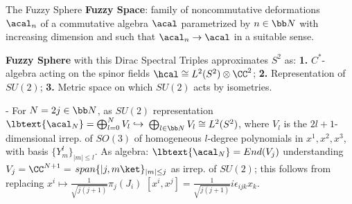 \begin{frame}{The Fuzzy Sphere} %
    \textbf{Fuzzy Space}: %
    family of noncommutative deformations $\acal_n$ of a commutative algebra $\acal$ parametrized by $n \in \bb N$ with increasing dimension and such that $\acal_n \to \acal$ in a suitable sense.
    
    \textbf{Fuzzy Sphere} with this Dirac Spectral Triples  \cite{DAndrea2013} approximates $S^2$ as: \textbf{1.} $C^*$-algebra acting on the spinor fields $\hcal \cong L^2(S^2)\otimes \CC^2$; \textbf{2.} Representation of $SU(2)$; \textbf{3.}  Metric space on which $SU(2)$ acts by isometries.
    
    - For $N = 2j \in \bb N$, as $SU(2)$ representation $\lbtext{\acal_N}= \bigoplus_{l = 0}^N V_l \hookrightarrow$ $ \bigoplus_{l \in \bb N} V_l \cong L^2(S^2)$, where $V_l$ is the $2l+1$-dimensional irrep. of $SO(3)$ of homogeneous $l$-degree polynomials in $x^1, x^2, x^3$, with basis $\{Y^l_m\}_{|m| \leq l}$. As algebra: $\lbtext{\acal_N} = End(V_j)$ understanding $V_j= \CC^{N+1} =$ $ span\{|j, m\ket\}_{|m| \leq j}$ as irrep. of $SU(2)$; this follows from replacing $x^i \mapsto \frac{1}{\sqrt{j(j+1)}} \pi_{j}(J_i)$ \then $[x^i, x^j] = \frac{1}{\sqrt{j(j+1)}} i \epsilon_{ijk} x_k$.%
    
\end{frame}